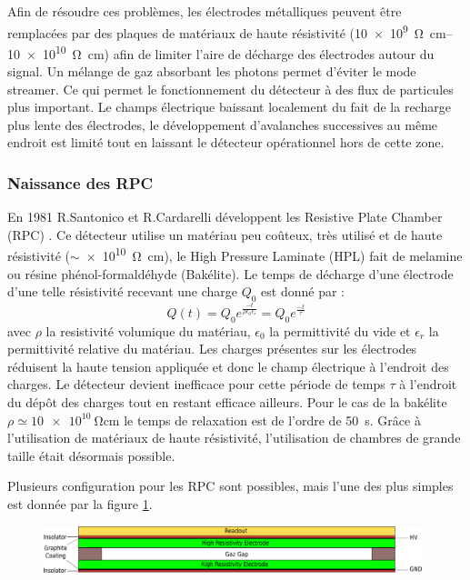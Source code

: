 Afin de résoudre ces problèmes, les électrodes métalliques peuvent être remplacées par des plaques de matériaux de haute résistivité (\SIrange{10e9}{10e10}{\ohm\centi\meter}) afin de limiter l'aire de décharge des électrodes autour du signal. Un mélange de gaz absorbant les photons permet d'éviter le mode streamer. Ce qui permet le fonctionnement du détecteur à des flux de particules plus important. Le champs électrique baissant localement du fait de la recharge plus lente des électrodes, le développement d'avalanches successives au même endroit est limité tout en laissant le détecteur opérationnel hors de cette zone.

\subsubsection{Naissance des RPC}
En 1981 R.Santonico et R.Cardarelli développent les Resistive Plate Chamber (RPC) \cite{Santonico:1981sc}. Ce détecteur utilise un matériau peu coûteux, très utilisé et de haute résistivité ($\sim$\SI{e10}{\ohm\centi\meter}), le High Pressure Laminate (HPL) fait de melamine ou résine phénol-formaldéhyde (Bakélite). Le temps de décharge d'une électrode d'une telle résistivité recevant une charge $Q_{0}$ est donné par :
\begin{equation}
Q(t)=Q_{0}e^{\frac{-t}{\rho\epsilon_{0}\epsilon_{r}}}=Q_{0}e^{\frac{-t}{\tau}}
\end{equation}
avec $\rho$ la resistivité volumique du matériau, $\epsilon_{0}$ la permittivité du vide et $\epsilon_{r}$ la permittivité relative du matériau.
Les charges présentes sur les électrodes réduisent la haute tension appliquée et donc le champ électrique à l'endroit des charges. Le détecteur devient inefficace pour cette période de temps $\tau$ à l'endroit du dépôt des charges tout en restant efficace ailleurs. Pour le cas de la bakélite $\rho\simeq\SI{10e10}{\ohm\centi\meter}$ le temps de relaxation est de l'ordre de \SI{50}{\second}. Grâce à l'utilisation de matériaux de haute résistivité, l'utilisation de chambres de grande taille était désormais possible.

Plusieurs configuration pour les RPC sont possibles, mais l'une des plus simples est donnée par la figure \ref{RPCscheme}.

\begin{figure}[h!]
	\centering
	\includegraphics[width=0.98\textwidth]{RPC/scheme_first.png}
	\label{RPCscheme}
\end{figure}

